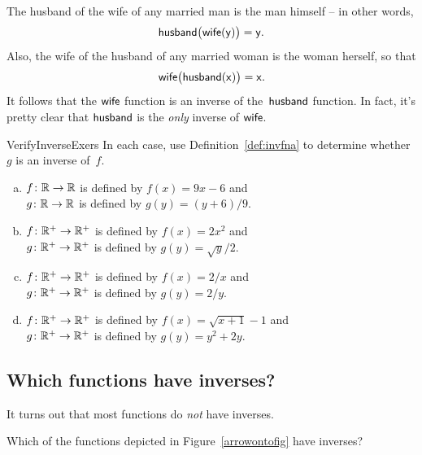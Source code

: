  \begin{example}{}
The husband of the wife of any married man is the man himself -- in other words,
$$ \sf{husband}\bigl( \sf{wife} (y) \bigr) = y. $$
Also, the wife of the husband of any married woman is the woman herself, so that
$$ \sf{wife}\bigl( \sf{husband} (x) \bigr) = x . $$
It follows that
the $\sf{wife}$ function is an inverse of the~$\sf{husband}$ function. In fact, it's pretty clear that $\sf{husband}$ is the \emph{only} inverse of $\sf{wife}$.
\end{example}
 

 \begin{exercise}{VerifyInverseExers}
 In each case, use Definition~\ref{def:invfna} to determine whether $g$ is an inverse of~$f$.
 \begin{enumerate}[(a)]
 \item \label{VerifyInverseExers-(9x-6)}
$f \colon \mathbb{R} \to \mathbb{R}$ is defined by $f(x) = 9x - 6$ and 
 \\ $g \colon \mathbb{R} \to \mathbb{R}$ is defined by $g(y) = (y + 6)/9$.
 \item \label{VerifyInverseExers-(x^2)}
$f \colon \mathbb{R}^+ \to \mathbb{R}^+$ is defined by $f(x) =2x^2$ and 
 \\ $g \colon \mathbb{R}^+ \to \mathbb{R}^+$ is defined by $g(y) = \sqrt{y}/2$.
 \item \label{VerifyInverseExers-(1/x)}
$f \colon \mathbb{R}^+ \to \mathbb{R}^+$ is defined by $f(x) = 2/x$ and 
 \\ $g \colon \mathbb{R}^+ \to \mathbb{R}^+$ is defined by $g(y) = 2/y$.
 \item \label{VerifyInverseExers-(sqrt(x+1)-1)}
$f \colon \mathbb{R}^+ \to \mathbb{R}^+$ is defined by $f(x) = \sqrt{x+1} - 1$ and 
 \\ $g \colon \mathbb{R}^+ \to \mathbb{R}^+$ is defined by $g(y) = y^2 + 2y$.
 \end{enumerate}
 \end{exercise}
   
\subsection{Which functions have inverses?}

It turns out that most functions do \emph{not} have inverses.  

\begin{exercise}{92}
Which of the functions depicted  in Figure~\ref{arrowontofig} have inverses?
 \end{exercise}

